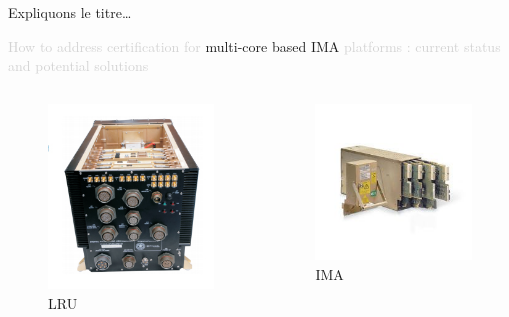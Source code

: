 \documentclass{beamer}
\begin{document}
\begin{frame}[t]{Expliquons le titre\ldots}

	\begin{center}
		\begin{mdframed}[style=yellowbox]
			{\small\textcolor{lightgray}{How to address certification for} multi-core based IMA \textcolor{lightgray}{platforms :
			current status and potential solutions}}
		\end{mdframed}
	\end{center}
  
  \begin{columns}
  
    \begin{column}{0.45\paperwidth}
        \begin{figure}
            \centering
            \includegraphics[width=0.3\paperwidth]{LRU.jpg}
            \caption{LRU}
            \label{fig:lru}
        \end{figure}
    \end{column}
    
    \begin{column}{0.45\paperwidth}
        \begin{figure}
            \centering
            \includegraphics[width=0.3\paperwidth]{IMA.jpg}
            \caption{IMA}
			\label{fig:ima}
        \end{figure}
    \end{column}
  
  \end{columns}
  
\end{frame}
\end{document}
